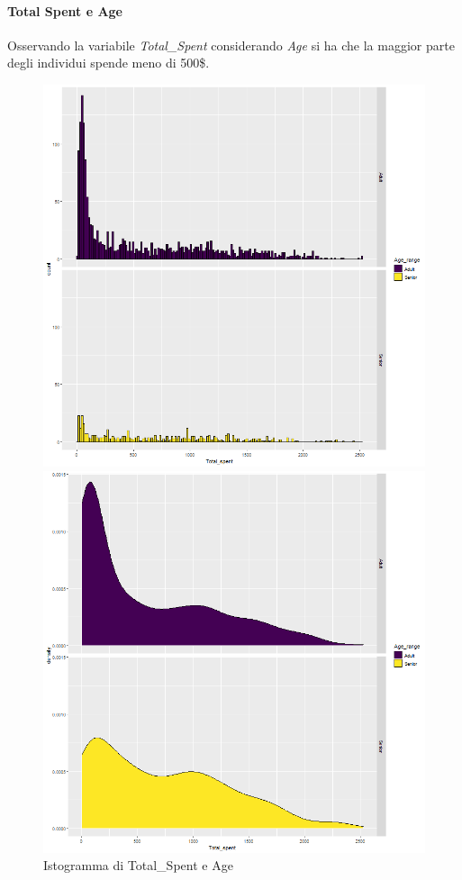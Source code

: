 \documentclass[letterpaper,11pt]{article}
\begin{document}
\paragraph{Total Spent e Age}
Osservando la variabile \textit{Total\_Spent} considerando \textit{Age} si ha che la maggior parte degli individui spende meno di 500\$.

\begin{figure}[h]
  \centering
  \begin{minipage}[b]{0.4\textwidth}
    \includegraphics[width=\textwidth]{Img/EDA/EDA024.png}
    \caption{Istogramma di Total\_Spent e Age}
     \label{fig:IstogrammaTsAge}
  \end{minipage}
  \hfill
  \begin{minipage}[b]{0.4\textwidth}
    \includegraphics[width=\textwidth]{Img/EDA/EDA025.png}

\end{minipage}
\end{figure}
\end{document}
